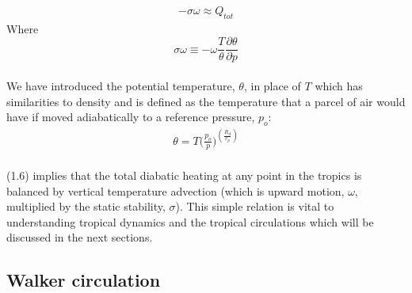 \documentclass[letterpaper,12pt,titlepage,oneside,final]{book}
\begin{document}
\begin{align}
-\sigma\omega \approx{Q_{tot}}
\end{align}
Where
\begin{equation}\label{eq:sp}
  \sigma\omega\equiv-\omega\frac{T}{\theta}\frac{\partial{\theta}}{\partial{p}}
\end{equation}
\\
We have introduced the potential temperature, $\theta$, in place of $T$ which has similarities to density and is defined as the temperature that a parcel of air would have if moved adiabatically to a reference pressure, $p_{o}$:
\begin{align}
\theta=T\Big(\frac{p_{o}}{p}\Big)^{(\frac{R_{d}}{c_{p}})}
\end{align}
\\
(1.6) implies that the total diabatic heating at any point in the tropics is balanced by vertical temperature advection (which is upward motion, $\omega$, multiplied by the static stability, $\sigma$).
This simple relation is vital to understanding tropical dynamics and the tropical circulations which will be discussed in the next sections.

\subsection{Walker circulation}\label{WC}
\end{document}
